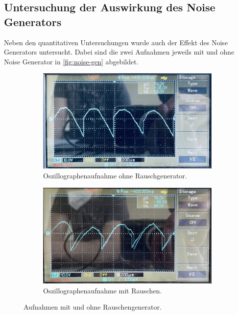\subsection{Untersuchung der Auswirkung des Noise Generators}
\label{sec:Untersuchung der Auswirkung des Noise Generators}
Neben den quantitativen Untersuchungen wurde auch der Effekt des Noise Generators
untersucht. Dabei sind die zwei Aufnahmen jeweils mit und ohne Noise Generator in 
\autoref{fig:noise-gen} abgebildet.
\begin{figure}[H]
	\centering
	\begin{subfigure}[b]{0.45\textwidth}
		\centering
		\includegraphics[width=\textwidth]{images/no-noise.JPG}
		\caption{Oszillographenaufnahme ohne Rauschgenerator.}
		\label{fig:osc-no-noise}
	\end{subfigure}
	\hfill
	\begin{subfigure}[b]{0.45\textwidth}
		\centering
		\includegraphics[width=\textwidth]{images/noise.jpg}
		\caption{Oszillographenaufnahme mit Rauschen.}
		\label{fig:osc-noise}
	\end{subfigure}
	\caption{Aufnahmen mit und ohne Rauschengenerator.}
	\label{fig:noise-gen}
\end{figure}

